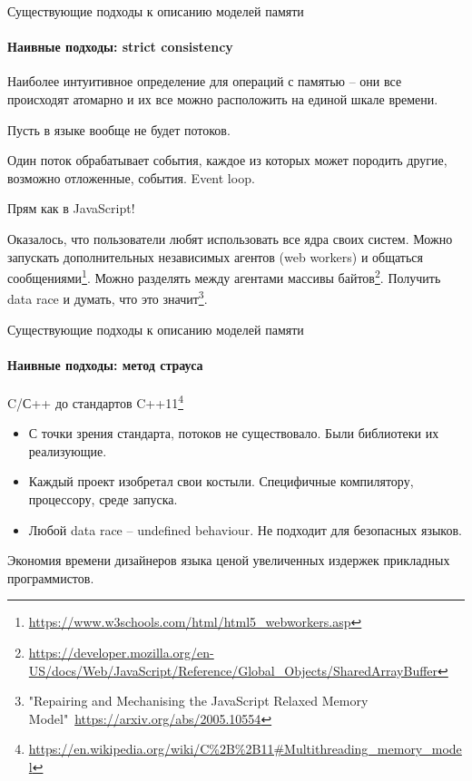 \begin{frame}[fragile, t]{Существующие подходы к описанию моделей памяти}
\framesubtitle{Наивные подходы: strict consistency}

Наиболее интуитивное определение для операций с памятью -- они все происходят атомарно и их все можно расположить на единой шкале времени.

\pause
Пусть в языке вообще не будет потоков.

\pause
Один поток обрабатывает события, каждое из которых может породить другие, возможно отложенные, события.
\pause
Event loop.

\pause
Прям как в JavaScript!

\pause
Оказалось, что пользователи любят использовать все ядра своих систем.
\pause
Можно запускать дополнительных независимых агентов (web workers) и общаться сообщениями\footnote<7->{\tiny\url{https://www.w3schools.com/html/html5_webworkers.asp}}.
\pause
Можно разделять между агентами массивы байтов\footnote<8->{\tiny\url{https://developer.mozilla.org/en-US/docs/Web/JavaScript/Reference/Global_Objects/SharedArrayBuffer}}.
\pause
Получить data race и думать, что это значит\footnote<9->{\tiny "Repairing and Mechanising the JavaScript Relaxed Memory Model"\ \url{https://arxiv.org/abs/2005.10554}}.

\end{frame}


\begin{frame}[t]{Существующие подходы к описанию моделей памяти}
\framesubtitle{Наивные подходы: метод страуса}

C/С++ до стандартов C++11\footnote{\tiny\url{https://en.wikipedia.org/wiki/C\%2B\%2B11#Multithreading_memory_model}}

\pause
\begin{itemize}
	\item С точки зрения стандарта, потоков не существовало. Были библиотеки их реализующие.
	\item Каждый проект изобретал свои костыли. Специфичные компилятору, процессору, среде запуска. 
	\item Любой data race -- undefined behaviour. Не подходит для безопасных языков.
\end{itemize}

\pause
Экономия времени дизайнеров языка ценой увеличенных издержек прикладных программистов.
\end{frame}


